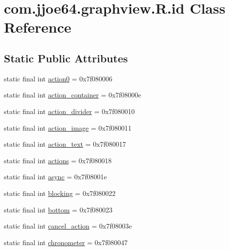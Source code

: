 \hypertarget{classcom_1_1jjoe64_1_1graphview_1_1_r_1_1id}{}\section{com.\+jjoe64.\+graphview.\+R.\+id Class Reference}
\label{classcom_1_1jjoe64_1_1graphview_1_1_r_1_1id}
\subsection*{Static Public Attributes}
\begin{DoxyCompactItemize}
\item 
static final int \mbox{\hyperlink{classcom_1_1jjoe64_1_1graphview_1_1_r_1_1id_a41d8edc56dd76bf1b12003742775af48}{action0}} = 0x7f080006
\item 
static final int \mbox{\hyperlink{classcom_1_1jjoe64_1_1graphview_1_1_r_1_1id_a4c71fcffe249fee5d7f96c178de9a3b6}{action\+\_\+container}} = 0x7f08000e
\item 
static final int \mbox{\hyperlink{classcom_1_1jjoe64_1_1graphview_1_1_r_1_1id_ab9021deed0e7e16d36634b29e1728316}{action\+\_\+divider}} = 0x7f080010
\item 
static final int \mbox{\hyperlink{classcom_1_1jjoe64_1_1graphview_1_1_r_1_1id_a40b952e8a1c15a96155c00b43dcb49b9}{action\+\_\+image}} = 0x7f080011
\item 
static final int \mbox{\hyperlink{classcom_1_1jjoe64_1_1graphview_1_1_r_1_1id_a005992e127483cd494a17f5ddae3ff5d}{action\+\_\+text}} = 0x7f080017
\item 
static final int \mbox{\hyperlink{classcom_1_1jjoe64_1_1graphview_1_1_r_1_1id_ad301adc7c05100d8ef7f8e114fed110b}{actions}} = 0x7f080018
\item 
static final int \mbox{\hyperlink{classcom_1_1jjoe64_1_1graphview_1_1_r_1_1id_a9e34b39616b390dc4e40dd0992de4d94}{async}} = 0x7f08001e
\item 
static final int \mbox{\hyperlink{classcom_1_1jjoe64_1_1graphview_1_1_r_1_1id_aa4e53cbf0efbc14fea000817dd20fed6}{blocking}} = 0x7f080022
\item 
static final int \mbox{\hyperlink{classcom_1_1jjoe64_1_1graphview_1_1_r_1_1id_a9d9baaee5275a2a673fafc3448b93821}{bottom}} = 0x7f080023
\item 
static final int \mbox{\hyperlink{classcom_1_1jjoe64_1_1graphview_1_1_r_1_1id_aa0851c0970e12c3c18fffc09dfc5383b}{cancel\+\_\+action}} = 0x7f08003e
\item 
static final int \mbox{\hyperlink{classcom_1_1jjoe64_1_1graphview_1_1_r_1_1id_ad6d22c5b8e20ee1c66257c9fa095a43e}{chronometer}} = 0x7f080047

\end{DoxyCompactItemize}
